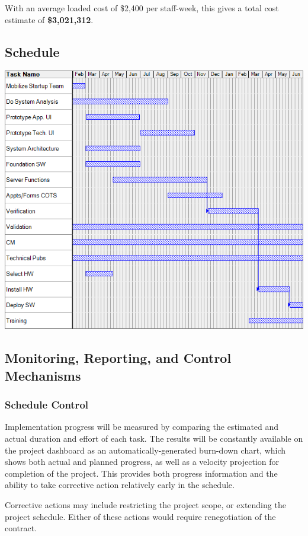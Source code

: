 \documentclass[11pt]{article}
\newcommand{\loadedcost}{\$2,400 per staff-week}
\begin{document}
With an average loaded cost of \loadedcost, this gives a total cost estimate of {\bf \$3,021,312}.


\subsection{Schedule}
\ifpdf
\includegraphics[width=\textwidth]{gantt.png}
\else
{}
\fi



\subsection{Monitoring, Reporting, and Control Mechanisms}

\subsubsection{Schedule Control}
Implementation progress will be measured by comparing the estimated and actual duration and effort
of each task.  The results will be constantly available on the project dashboard as an
automatically-generated burn-down chart, which shows both actual and planned progress, as well as a
velocity projection for completion of the project.  This provides both progress information and the
ability to take corrective action relatively early in the schedule.

Corrective actions may include restricting the project scope, or extending the project schedule.
Either of these actions would require renegotiation of the contract.
\end{document}
